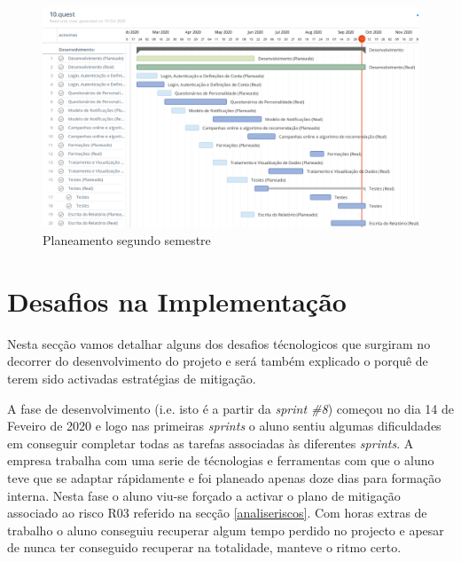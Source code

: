 \begin{figure}[ht!]
	\begin{center}
		\includegraphics[width=1\textwidth]{img/dev}
		\caption{Planeamento segundo semestre}
		\label{fig:plane_2_semestre}
	\end{center}
\end{figure}

\section{Desafios na Implementação}
\label{sec:dificuldades}

Nesta secção vamos detalhar alguns dos desafios técnologicos que surgiram no decorrer do desenvolvimento do projeto e será também explicado o porquê de terem sido activadas estratégias de mitigação.

A fase de desenvolvimento (i.e. isto é a partir da \textit{sprint \#8}) começou no dia 14 de Feveiro de 2020 e logo nas primeiras \textit{sprints} o aluno sentiu algumas dificuldades em conseguir completar todas as tarefas associadas às diferentes \textit{sprints}. A empresa trabalha com uma serie de técnologias e ferramentas com que o aluno teve que se adaptar rápidamente e foi planeado apenas doze dias para formação interna. Nesta fase o aluno viu-se forçado a activar o plano de mitigação associado ao risco R03 referido na secção \ref{analiseriscos}. Com horas extras de trabalho o aluno conseguiu recuperar algum tempo perdido no projecto e apesar de nunca ter conseguido recuperar na totalidade, manteve o ritmo certo.

